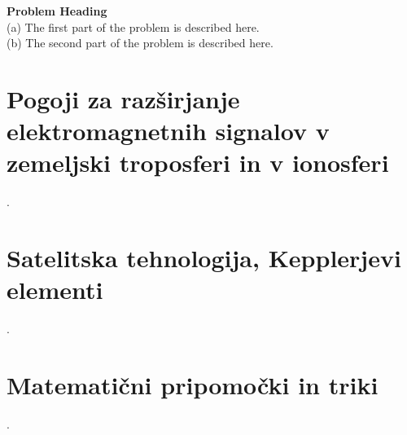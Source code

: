 \begin{prob}
	\label{prob2}
	\textbf{Problem Heading}\\
	(a) The first part of the problem is described here.\\
	(b) The second part of the problem is described here.
\end{prob}

\section{Pogoji za razširjanje elektromagnetnih signalov v zemeljski troposferi in v ionosferi}
\label{sec:1}
\cite{monograph}.

\section{Satelitska tehnologija, Kepplerjevi elementi}
\label{sec:1}
\cite{monograph}.

\section{Matematični pripomočki in triki}
\label{sec:1}
\cite{monograph}.

%

